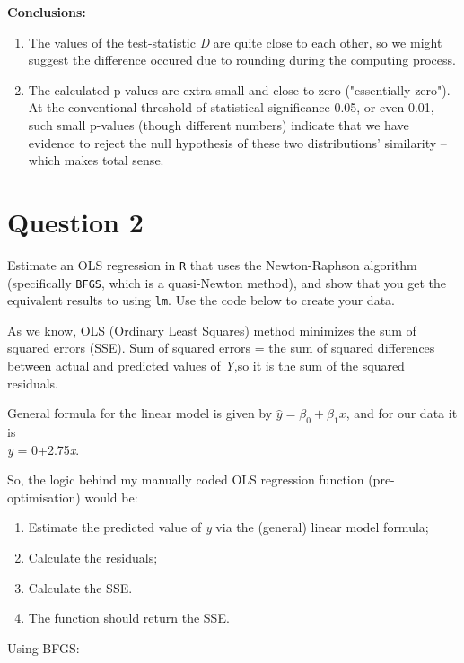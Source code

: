 \documentclass[12pt,letterpaper]{article}
\begin{document}
\textbf{Conclusions:}
\begin{enumerate}[noitemsep]
\item The values of the test-statistic \textit{D } are quite close to each other, so we might suggest the difference occured due to rounding during the computing process.
\item The calculated p-values are extra small and close to zero ("essentially zero"). At the conventional threshold of statistical significance 0.05, or even 0.01, such small p-values (though different numbers) indicate that we have evidence to reject the null hypothesis of these two distributions' similarity -- which makes total sense.
\end{enumerate}


\section*{Question 2}
\noindent Estimate an OLS regression in \texttt{R} that uses the Newton-Raphson algorithm (specifically \texttt{BFGS}, which is a quasi-Newton method), and show that you get the equivalent results to using \texttt{lm}. Use the code below to create your data.
 
\vspace{.5cm}


As we know, OLS (Ordinary Least Squares) method minimizes the sum of squared errors (SSE). Sum of squared errors = the sum of squared differences between actual and predicted values of \textit{Y},so it is the sum of the squared residuals.

General formula for the linear model is given by $\hat{y} = \beta_0 + \beta_1 x$, and for our data it is \\ \textit{y} = 0+2.75\textit{x}.

So, the logic behind my manually coded OLS regression function (pre-optimisation) would be:
\begin{enumerate}[noitemsep]
	\item Estimate the predicted value of \textit{y} via the (general) linear model formula;
	\item Calculate the residuals;
	\item Calculate the SSE.
	\item The function should return the SSE.
\end{enumerate}

 

Using BFGS:
 
\end{document}
